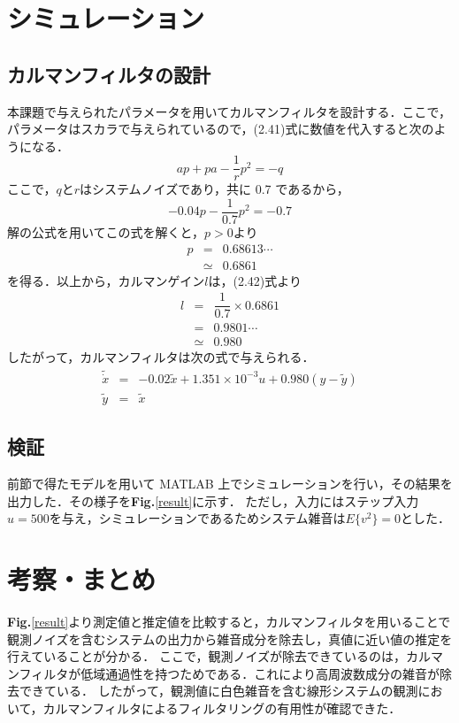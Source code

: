 \documentclass[a4paper,12pt]{jarticle}
\begin{document}
\section{シミュレーション}
%
\subsection{カルマンフィルタの設計}
%
本課題で与えられたパラメータを用いてカルマンフィルタを設計する．ここで，パラメータはスカラで与えられているので，(2.41)式に数値を代入すると次のようになる．
%
\begin{equation}
 ap + pa - \dfrac{1}{r}p^2 = -q
\end{equation}
%
ここで，$ q $と$ r $はシステムノイズであり，共に 0.7 であるから，
%
\begin{equation}
 -0.04p - \dfrac{1}{0.7}p^2 = -0.7
\end{equation}
%
解の公式を用いてこの式を解くと，$ p > 0 $より
%
\begin{eqnarray}
 p & = & 0.68613 \cdots \nonumber \\
   & \simeq & 0.6861
\end{eqnarray}
%
を得る．以上から，カルマンゲイン$ l $は，(2.42)式より
%
\begin{eqnarray}
 l & = & \dfrac{1}{0.7} \times 0.6861 \\
   & = & 0.9801 \cdots\\
   & \simeq & 0.980
\end{eqnarray}
%
したがって，カルマンフィルタは次の式で与えられる．
%
\begin{equation}
 \begin{array}{rcl}
  \tilde{\dot{x}} & = &  -0.02 \tilde{x} + 1.351 \times 10^{-3} u + 0.980 ( y - \tilde{y} ) \\
  \tilde{y} & = & \tilde{x}
 \end{array}
\end{equation}
%



\subsection{検証}
%
前節で得たモデルを用いて MATLAB 上でシミュレーションを行い，その結果を出力した．その様子を{\bf Fig.}\ref{result}に示す．
ただし，入力にはステップ入力$ u = 500 $を与え，シミュレーションであるためシステム雑音は$ E\{ v^2 \} = 0 $とした．

\section{考察・まとめ}
%
{\bf Fig.}\ref{result}より測定値と推定値を比較すると，カルマンフィルタを用いることで観測ノイズを含むシステムの出力から雑音成分を除去し，真値に近い値の推定を行えていることが分かる．
ここで，観測ノイズが除去できているのは，カルマンフィルタが低域通過性を持つためである\cite{2}．これにより高周波数成分の雑音が除去できている．
したがって，観測値に白色雑音を含む線形システムの観測において，カルマンフィルタによるフィルタリングの有用性が確認できた．
\end{document}
